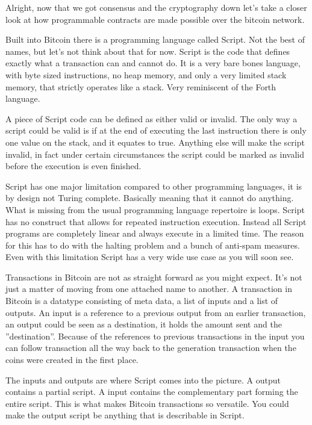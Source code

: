 Alright, now that we got consensus and the cryptography down let's take a closer look at how programmable contracts
are made possible over the bitcoin network.

Built into Bitcoin there is a programming language called Script. Not the best of names,
but let's not think about that for now. Script is the code that defines exactly what a transaction can and
cannot do. It is a very bare bones language, with byte sized instructions, no heap memory,
and only a very limited stack memory, that strictly operates like a stack.
Very reminiscent of the Forth language.

A piece of Script code can be defined as either valid or invalid. The only
way a script could be valid is if at the end of executing the last instruction
there is only one value on the stack, and it equates to true. Anything else
will make the script invalid, in fact under certain circumstances the
script could be marked as invalid before the execution is even finished.

Script has one major limitation compared to other programming languages, it is by design
not Turing complete. Basically meaning
that it cannot do anything. What is missing from the usual programming language repertoire
is loops. Script has no construct that allows for repeated instruction execution.
Instead all Script programs are completely linear and always execute in a limited time.
The reason for this has to do with the halting problem and a bunch of anti-spam
measures. Even with this limitation Script has a very wide use case as you will soon see.

Transactions in Bitcoin are not as straight forward as you might expect.
It's not just a matter of moving from one attached name to another.
A transaction in Bitcoin is a datatype consisting of meta data, a list
of inputs and a list of outputs. An input is a reference to a previous
output from an earlier transaction, an output could be seen as a destination,
it holds the amount sent and the ''destination''. Because of
the references to previous transactions in the input you can
follow transaction all the way back to the generation
transaction when the coins were created in the first place.

The inputs and outputs are where Script comes into the picture.
A output contains a partial script. A input contains the
complementary part forming the entire script. This is what makes Bitcoin
transactions so versatile. You could make the output script
be anything that is describable in Script.

